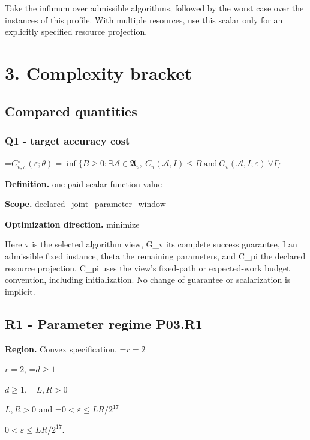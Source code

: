 \documentclass[10pt,a4paper]{article}
\newcommand{\AtlasMath}[1]{\par\begingroup\centering\setbox0=\hbox{$\displaystyle #1$}\ifdim\wd0>1.4\linewidth\typeout{ATLAS WIDE FORMULA: \the\wd0}\fi\ifdim\wd0>\linewidth\resizebox{\linewidth}{!}{\box0}\else\box0\fi\par\endgroup}
\newcommand{\AtlasInlineMath}[1]{\begingroup\setbox0=\hbox{$#1$}\ifdim\wd0>.4\linewidth\endgroup\AtlasMath{#1}\else\endgroup$#1$\fi}
\begin{document}
Take the infimum over admissible algorithms, followed by the worst case over the instances of this profile. With multiple resources, use this scalar only for an explicitly specified resource projection.



\section{3. Complexity bracket}


\subsection{Compared quantities}


\subsubsection{Q1 - target accuracy cost}


\AtlasMath{C^\star_{v,\pi}(\varepsilon;\theta)=\inf\{B\ge0:\exists\mathcal A\in\mathfrak A_v,\ C_\pi(\mathcal A,I)\le B\ \text{and}\ G_v(\mathcal A,I;\varepsilon)\ \forall I\}}


\textbf{Definition.} one paid scalar function value



\textbf{Scope.} declared\_joint\_parameter\_window



\textbf{Optimization direction.} minimize



Here v is the selected algorithm view, G\_v its complete success guarantee, I an admissible fixed instance, theta the remaining parameters, and C\_pi the declared resource projection. C\_pi uses the view's fixed-path or expected-work budget convention, including initialization. No change of guarantee or scalarization is implicit.



\subsection{R1 - Parameter regime P03.R1}


\textbf{Region.} Convex specification, \AtlasInlineMath{r=2}, \AtlasInlineMath{d\ge1}, \AtlasInlineMath{L,R>0} and \AtlasInlineMath{0<\varepsilon\le LR/2^{17}}.
\end{document}
